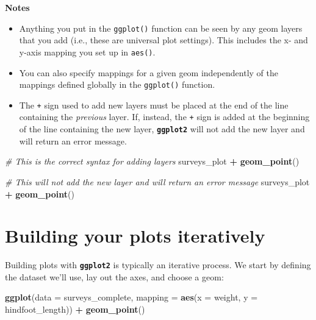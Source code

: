 \documentclass[]{book}
\newenvironment{Shaded}{\begin{snugshade}}{\end{snugshade}}
\newcommand{\KeywordTok}[1]{\textcolor[rgb]{0.13,0.29,0.53}{\textbf{#1}}}
\newcommand{\DataTypeTok}[1]{\textcolor[rgb]{0.13,0.29,0.53}{#1}}
\newcommand{\StringTok}[1]{\textcolor[rgb]{0.31,0.60,0.02}{#1}}
\newcommand{\CommentTok}[1]{\textcolor[rgb]{0.56,0.35,0.01}{\textit{#1}}}
\newcommand{\OperatorTok}[1]{\textcolor[rgb]{0.81,0.36,0.00}{\textbf{#1}}}
\newcommand{\NormalTok}[1]{#1}
\providecommand{\tightlist}{%
  \setlength{\itemsep}{0pt}\setlength{\parskip}{0pt}}
\begin{document}
\textbf{Notes}

\begin{itemize}
\tightlist
\item
  Anything you put in the \texttt{ggplot()} function can be seen by any
  geom layers that you add (i.e., these are universal plot settings).
  This includes the x- and y-axis mapping you set up in \texttt{aes()}.
\item
  You can also specify mappings for a given geom independently of the
  mappings defined globally in the \texttt{ggplot()} function.
\item
  The \texttt{+} sign used to add new layers must be placed at the end
  of the line containing the \emph{previous} layer. If, instead, the
  \texttt{+} sign is added at the beginning of the line containing the
  new layer, \textbf{\texttt{ggplot2}} will not add the new layer and
  will return an error message.
\end{itemize}

\begin{Shaded}
\begin{Highlighting}[]
\CommentTok{# This is the correct syntax for adding layers}
\NormalTok{surveys_plot }\OperatorTok{+}
\StringTok{  }\KeywordTok{geom_point}\NormalTok{()}

\CommentTok{# This will not add the new layer and will return an error message}
\NormalTok{surveys_plot}
  \OperatorTok{+}\StringTok{ }\KeywordTok{geom_point}\NormalTok{()}
\end{Highlighting}
\end{Shaded}

\section{Building your plots
iteratively}\label{building-your-plots-iteratively}

Building plots with \textbf{\texttt{ggplot2}} is typically an iterative
process. We start by defining the dataset we'll use, lay out the axes,
and choose a geom:

\begin{Shaded}
\begin{Highlighting}[]
\KeywordTok{ggplot}\NormalTok{(}\DataTypeTok{data =}\NormalTok{ surveys_complete, }\DataTypeTok{mapping =} \KeywordTok{aes}\NormalTok{(}\DataTypeTok{x =}\NormalTok{ weight, }\DataTypeTok{y =}\NormalTok{ hindfoot_length)) }\OperatorTok{+}
\StringTok{    }\KeywordTok{geom_point}\NormalTok{()}
\end{Highlighting}
\end{Shaded}
\end{document}
